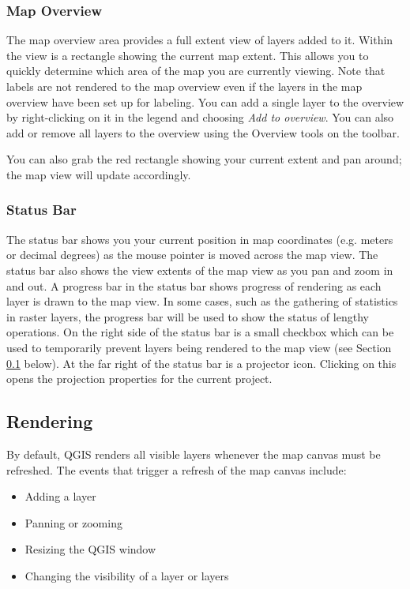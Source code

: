 \subsubsection{Map Overview}\label{label_mapoverview}

The map overview area provides a full extent view of layers added to it.
Within the view is a rectangle showing the current map extent. This allows
you to quickly determine which area of the map you are currently viewing. Note
that labels are not rendered to the map overview even if the layers in the
map overview have been set up for labeling. 
You can add a single layer to the
overview by right-clicking on it in the legend and choosing \textit{Add
to overview}. You can also add or remove all layers to the overview using the
Overview tools on the toolbar.

You can also grab the red rectangle showing your current extent and pan around; the
map view will update accordingly.

\subsubsection{Status Bar}\label{label_statusbar}

The status bar shows you your current position in map coordinates (e.g.
meters or decimal degrees) as the mouse pointer is moved across the map view.
The status bar also shows the view extents of the map view as you pan and
zoom in and out. A progress bar in the status bar shows progress of rendering
as each layer is drawn to the map view. In some cases, such as the gathering
of statistics in raster layers, the progress bar will be used to show the
status of lengthy operations. On the right side of the status bar is a small
checkbox which can be used to temporarily prevent layers being rendered to the
map view (see Section \ref{subsec:redraw_events} below). At the far right of
the status bar is a projector icon. Clicking on this opens the projection
properties for the current project.

\subsection{Rendering}\label{subsec:redraw_events}

By default, QGIS renders all visible layers whenever the map canvas must be
refreshed. The events that trigger a refresh of the map canvas include:

\begin{itemize}
\item Adding a layer
\item Panning or zooming
\item Resizing the QGIS window
\item Changing the visibility of a layer or layers
\end{itemize}

